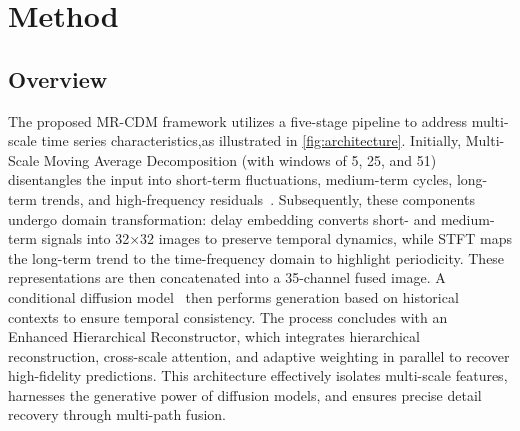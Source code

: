 \section{Method}\label{sec:solution}

\subsection{Overview}

The proposed MR-CDM framework utilizes a five-stage pipeline to address multi-scale time series characteristics,as illustrated in \autoref{fig:architecture}. Initially, Multi-Scale Moving Average Decomposition (with windows of 5, 25, and 51) disentangles the input into short-term fluctuations, medium-term cycles, long-term trends, and high-frequency residuals~\cite{shen_multi-resolution_2024}. Subsequently, these components undergo domain transformation: delay embedding converts short- and medium-term signals into 32×32 images to preserve temporal dynamics, while STFT maps the long-term trend to the time-frequency domain to highlight periodicity. These representations are then concatenated into a 35-channel fused image. A conditional diffusion model~\cite{NEURIPS2020_4c5bcfec} then performs generation based on historical contexts to ensure temporal consistency. The process concludes with an Enhanced Hierarchical Reconstructor, which integrates hierarchical reconstruction, cross-scale attention, and adaptive weighting in parallel to recover high-fidelity predictions. This architecture effectively isolates multi-scale features, harnesses the generative power of diffusion models, and ensures precise detail recovery through multi-path fusion.


